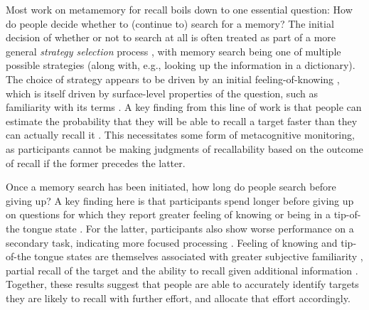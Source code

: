 Most work on metamemory for recall boils down to one essential question: How do people decide whether to (continue to) search for a memory? The initial decision of whether or not to search at all is often treated as part of a more general \emph{strategy selection} process \citep{reder1988strategic}, with memory search being one of multiple possible strategies (along with, e.g., looking up the information in a dictionary). The choice of strategy appears to be driven by an initial feeling-of-knowing \citep{nhouyvanisvong1998rapid}, which is itself driven by surface-level properties of the question, such as familiarity with its terms \citep{reder1992determines}. A key finding from this line of work is that people can estimate the probability that they will be able to recall a target faster than they can actually recall it \citep{reder1987strategy}. This necessitates some form of metacognitive monitoring, as participants cannot be making judgments of recallability based on the outcome of recall if the former precedes the latter.

Once a memory search has been initiated, how long do people search before giving up? A key finding here is that participants spend longer before giving up on questions for which they report greater feeling of knowing \citep{nelson1984comparison,nhouyvanisvong1998rapid,gruneberg1977methodological,lachman1979metamemory} or being in a tip-of-the tongue state \citep{schwartz2001relation}. For the latter, participants also show worse performance on a secondary task, indicating more focused processing \citep{ryan1982motivated}. Feeling of knowing and tip-of-the tongue states are themselves associated with greater subjective familiarity \citep{reder1988strategic}, partial recall of the target \citep{brown1966tip,koriat1993how,schacter1985attribute} and the ability to recall given additional information \citep{gruneberg1974feeling}. Together, these results suggest that people are able to accurately identify targets they are likely to recall with further effort, and allocate that effort accordingly.


